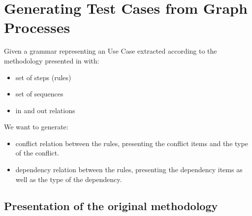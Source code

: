 \chapter{Generating Test Cases from Graph Processes}

Given a grammar representing an Use Case extracted according to the methodology presented in \cite{Junior} with:

\begin{itemize}
\item set of steps (rules)
\item set of sequences
\item in and out relations
\end{itemize}

We want to generate:

\begin{itemize}
\item conflict relation between the rules, presenting the conflict items and the type of the conflict.
\item dependency relation between the rules, presenting the dependency items as well as the type of the dependency.
\end{itemize}

\section{Presentation of the original methodology}





